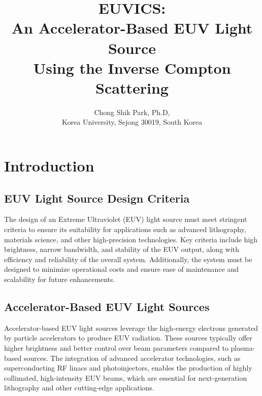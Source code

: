\documentclass[10pt]{article}
\title{\Large{\bf EUVICS}: \\
        \Large{\bf An Accelerator-Based EUV Light Source  \\
        Using the Inverse Compton Scattering
}}
\author{\large Chong Shik Park, Ph.D, \\
Korea University, Sejong 30019, South Korea}
\begin{document}
\maketitle

\tableofcontents


\newpage

\section{Introduction}

  \subsection{EUV Light Source Design Criteria}
  
  The design of an Extreme Ultraviolet (EUV) light source must meet stringent criteria to ensure its suitability for applications such as advanced lithography, materials science, and other high-precision technologies. Key criteria include high brightness, narrow bandwidth, and stability of the EUV output, along with efficiency and reliability of the overall system. Additionally, the system must be designed to minimize operational costs and ensure ease of maintenance and scalability for future enhancements.
  
  \subsection{Accelerator-Based EUV Light Sources}
  
  Accelerator-based EUV light sources leverage the high-energy electrons generated by particle accelerators to produce EUV radiation. These sources typically offer higher brightness and better control over beam parameters compared to plasma-based sources. The integration of advanced accelerator technologies, such as superconducting RF linacs and photoinjectors, enables the production of highly collimated, high-intensity EUV beams, which are essential for next-generation lithography and other cutting-edge applications.
  
\end{document}
